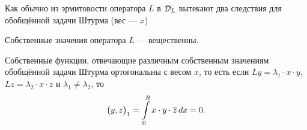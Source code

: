 Как обычно из эрмитовости оператора $L$ в $\mathcal{D}_L$ вытекают два следствия для обобщённой задачи Штурма (вес --- $x$) 
\begin{enumerateD}
	\item Собственные значения оператора $L$ --- вещественны.
	\item Собственные функции, отвечающие различным собственным значениям обобщённой задачи Штурма ортогональны с весом $x$, то есть если $Ly=\lambda_1\cdot x\cdot y$, $Lz=\lambda_2\cdot x\cdot z$ и $\lambda_1\neq\lambda_2$, то 
	\begin{equation*}
		\hfill\big(y,z\big)_1=\int\limits_0^R x\cdot y\cdot\overline{z}\,dx=0.\hfill
	\end{equation*}
\end{enumerateD} 
